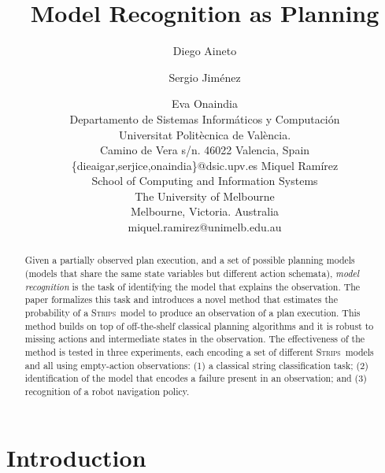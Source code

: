 \documentclass[letterpaper]{article} %
\newcommand{\strips}{\textsc{Strips}}     %
\begin{document}
\title{Model Recognition as Planning}


\author{Diego Aineto \and Sergio Jim\'enez\and Eva Onaindia\\
{\scriptsize Departamento de Sistemas Inform\'aticos y Computaci\'on}\\
{\scriptsize Universitat Polit\`ecnica de Val\`encia.}\\
{\scriptsize Camino de Vera s/n. 46022 Valencia, Spain}\\
{\scriptsize \{dieaigar,serjice,onaindia\}@dsic.upv.es}
\And Miquel Ram\'irez\\
{\scriptsize School of Computing and Information Systems}\\
{\scriptsize The University of Melbourne}\\
{\scriptsize Melbourne, Victoria. Australia}\\
{\scriptsize miquel.ramirez@unimelb.edu.au}}


\maketitle
\begin{abstract}
Given a partially observed plan execution, and a set of possible planning models (models that share the same state variables but different action schemata), {\em model recognition} is the task of identifying the model that explains the observation. The paper formalizes this task and introduces a novel method that estimates the probability of a \strips\ model to produce an observation of a plan execution. This method builds on top of off-the-shelf classical planning algorithms and it is robust to missing actions and intermediate states in the observation. The effectiveness of the method is tested in three experiments, each encoding a set of different \strips\ models and all using empty-action observations: (1) a classical string classification task; (2) identification of the model that encodes a failure present in an observation; and (3) recognition of a robot navigation policy.
\end{abstract}

\section{Introduction}
\label{sec:introduction}
\end{document}
